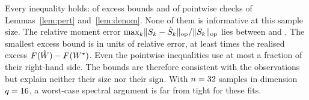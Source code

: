 Every inequality holds: \SThreeNBoundsHold{} of \SThreeNCells{} excess bounds and
\SThreeNPointwiseHold{} of \SThreeNPointwiseChecks{} pointwise checks of Lemmas~\ref{lem:pert}
and~\ref{lem:denom}. None of them is informative at this sample size. The relative moment error
$\max_k\lVert S_k-\hat{S}_k\rVert_{\mathrm{op}}/\lVert S_k\rVert_{\mathrm{op}}$ lies between \SThreeRelOpErrMin{} and
\SThreeRelOpErrMax{}. The smallest excess bound is \SThreeMinBound{} in units of relative error,
at least \SThreeMinBoundOverExcess{} times the realised excess $F(\hat{W})-F(W^\star)$. Even the
pointwise inequalities use at most a fraction \SThreePointwiseMaxRatio{} of their right-hand side.
The bounds are therefore consistent with the observations but explain neither their size nor
their sign. With $n=32$ samples in dimension $q=16$, a worst-case spectral argument is
far from tight for these fits.
